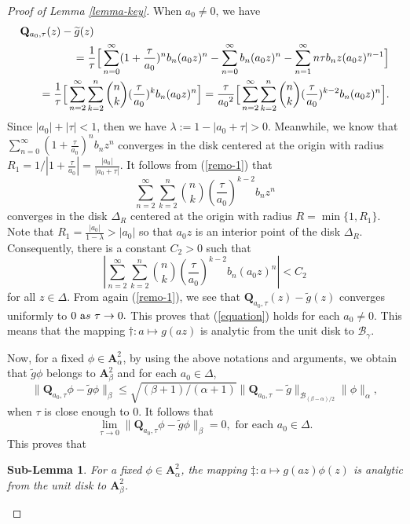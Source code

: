 \documentclass[10pt]{amsart}
\newtheorem{sub-lemma}[theorem]{Sub-Lemma}
\theoremstyle{definition}    %
\numberwithin{equation}{section}
\begin{document}
\begin{proof}[Proof of Lemma \ref{lemma-key}]
When $a_0\neq 0$, we have
\begin{eqnarray}\label{remo-1} 
 \lefteqn{\mathbf{Q}_{a_0,\tau}(z)-\widetilde{g}(z)}
 \nonumber \\
 &&\quad=\frac{1}{\tau}\Big[\sum_{n=0}^{\infty}(1+\frac{\tau}{a_0})^nb_n(a_0z)^n-\sum_{n=0}^{\infty}b_n(a_0z)^n-\sum_{n=1}^{\infty}n\tau b_nz(a_0z)^{n-1}\Big]\nonumber \\
&&\quad=\frac{1}{\tau}\Big[\sum_{n=2}^{\infty}\sum_{k=2}^n \binom{n}{k}(\frac{\tau}{a_0})^{k}b_n(a_0 z)^{n}\Big]=\frac{\tau}{{a_0}^{2}}\Big[\sum_{n=2}^{\infty}\sum_{k=2}^n \binom{n}{k}(\frac{\tau}{a_0})^{k-2}b_n(a_0 z)^{n}\Big].
\end{eqnarray}
Since $|a_0|+|\tau|<1$, then we have $\lambda:=1-|a_0+\tau|>0$. Meanwhile, we know that 
$\sum_{n=0}^{\infty}(1+\frac{\tau}{a_0})^nb_n z^n$
converges in the disk centered at the origin with radius $R_1=1/|1+\frac{\tau}{a_0}|=\frac{|a_0|}{|a_0+\tau|}$. It follows from (\ref{remo-1}) that 
$$\sum_{n=2}^{\infty}\sum_{k=2}^n \binom{n}{k}(\frac{\tau}{a_0})^{k-2}b_n z^{n}$$ 
converges in the disk $\Delta_{R}$ centered at the origin with radius $R=\min\{1, R_1\}$. Note that $R_1=\frac{|a_0|}{1-\lambda}>|a_0|$ so that $a_0z$ is an interior point of the disk $\Delta_{R}$. 
Consequently, there is a constant $C_2>0$ such that $$|\sum_{n=2}^{\infty}\sum_{k=2}^n \binom{n}{k}(\frac{\tau}{a_0})^{k-2}b_n(a_0 z)^{n}|<C_2
$$
for all $z\in \Delta$.  From again (\ref{remo-1}), we see that 
$\mathbf{Q}_{a_0,\tau}(z)-\widetilde{g}(z)$
converges uniformly to $0\,\, {\text as}\,\, \tau\to 0.$ This proves that (\ref{equation}) holds for each $a_0\neq0$. 
This means that the mapping $\dag: a \mapsto g(az)$ is analytic from the unit disk to $\mathcal{B}_{\gamma}$.

Now, for a fixed $\phi \in \mathbf{A}_{\alpha}^2$, by using the above notations and arguments, we obtain that $\widetilde{g}\phi$ belongs to $\mathbf{A}_{\beta}^2$ and for each $a_0\in \Delta$,
$$
\|\mathbf{Q}_{a_0, \tau}\phi-\widetilde{g}\phi\|_{\beta}\leq \sqrt{(\beta+1)/{(\alpha+1)}} \|\mathbf{Q}_{a_0, \tau}-\widetilde{g}\|_{\mathcal{B}_{(\beta-\alpha)/2}}\|\phi\|_{\alpha},\nonumber
$$
when $\tau$ is close enough to $0$. It follows that 
$$
\lim_{\tau \to 0} \|\mathbf{Q}_{a_0, \tau}\phi-\widetilde{g}\phi\|_{\beta}=0,\,\,{\text{for each}\,\,a_0\in \Delta}.
$$
This proves that 
\begin{sub-lemma}\label{sub-1}
For a fixed $\phi \in \mathbf{A}_{\alpha}^2$, the mapping $\ddag: a\mapsto g(az)\phi(z)$ is analytic from the unit disk to $\mathbf{A}_{\beta}^2$. 
\end{sub-lemma} 


\end{proof}
\end{document}
